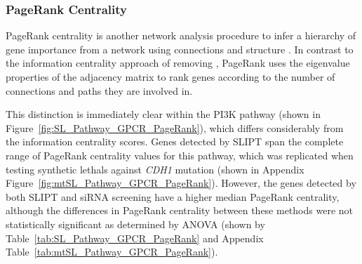 \begin{table*}[!htb]
\caption{\acrshort{ANOVA} for synthetic lethality and information centrality}
\label{tab:SL_Pathway_GPCR_InfoCent}
\noindent{}
\end{table*} \filbreak

\FloatBarrier

\subsubsection{PageRank Centrality}  \label{chapt4:Network_PageRank}

\FloatBarrier

\gls{PageRank centrality} is another network analysis procedure to infer a hierarchy of gene importance from a network using connections and structure \citep{Brin1998}. In contrast to the \gls{information centrality} approach of removing , PageRank uses the eigenvalue properties of the adjacency matrix to rank genes according to the number of connections and paths they are involved in. 

This distinction is immediately clear within the \gls{PI3K} pathway (shown in Figure~\ref{fig:SL_Pathway_GPCR_PageRank}), which differs considerably from the \gls{information centrality} scores. Genes detected by \gls{SLIPT} span the complete range of \gls{PageRank centrality} values for this pathway, which was replicated when testing \glspl{synthetic lethal} against \textit{CDH1} \gls{mutation} (shown in Appendix Figure~\ref{fig:mtSL_Pathway_GPCR_PageRank}).  However, the genes detected by both \gls{SLIPT} and \gls{siRNA} screening have a higher median \gls{PageRank centrality}, although the differences in \gls{PageRank centrality} between these methods were not statistically significant as determined by \gls{ANOVA} (shown by Table~\ref{tab:SL_Pathway_GPCR_PageRank} and Appendix Table~\ref{tab:mtSL_Pathway_GPCR_PageRank}).

